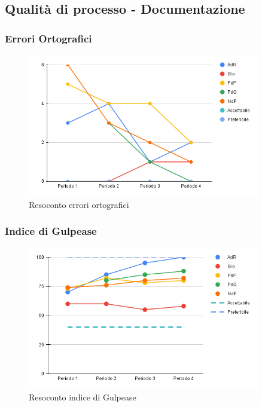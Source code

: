 \subsection{Qualità di processo - Documentazione}

\subsubsection{Errori Ortografici}
\begin{figure}[H]
    \centering
    \includegraphics[width=0.9\textwidth]{../Images/PianoDiQualifica/errori_ortografici.png}
    \caption{Resoconto errori ortografici}
    \label{fig:Errori ortografici}
\end{figure}

\subsubsection{Indice di Gulpease}
\begin{figure}[H]
    \centering
    \includegraphics[width=0.9\textwidth]{../Images/PianoDiQualifica/Gulpease.png}
    \caption{Resoconto indice di Gulpease}
    \label{fig:Indice di Gulpease}
\end{figure}